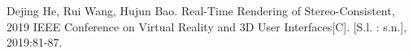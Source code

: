 \begin{publications}
\begin{enumerate}[label={[\arabic*]}]
\item Dejing He, Rui Wang, Hujun Bao. Real-Time Rendering of Stereo-Consistent, 2019 IEEE Conference on Virtual Reality and 3D User Interfaces[C]. [S.l. : s.n.], 2019:81-87.
\end{enumerate}

\end{publications}
